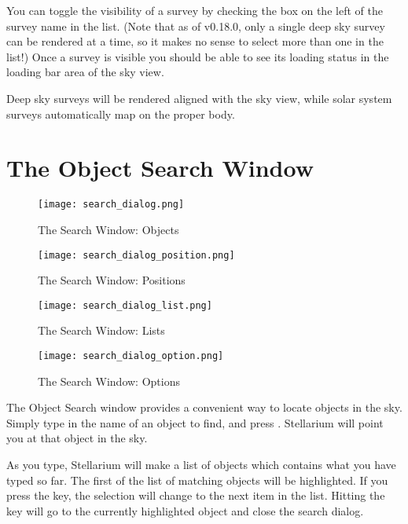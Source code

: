 You can toggle the visibility of a survey by checking the box on the left
of the survey name in the list.  (Note that as of v0.18.0, only a single deep
sky survey can be rendered at a time, so it makes no sense to select more than one in
the list!) Once a survey is visible you should be able to see its loading
status in the loading bar area of the sky view.

Deep sky surveys will be rendered aligned with the sky view, while solar system
surveys automatically map on the proper body.


\section{The Object Search Window}
\label{sec:gui:search}

\begin{figure}[h]
\centering\texttt{[image: search\_dialog.png]}
\caption{The Search Window: Objects}
\label{fig:gui:search}
\end{figure}

\begin{figure}[h]
\centering\texttt{[image: search\_dialog\_position.png]}
\caption{The Search Window: Positions}
\label{fig:gui:search:position}
\end{figure}

\begin{figure}[h]
\centering\texttt{[image: search\_dialog\_list.png]}
\caption{The Search Window: Lists}
\label{fig:gui:search:lists}
\end{figure}


\begin{figure}[h]
\centering\texttt{[image: search\_dialog\_option.png]}
\caption{The Search Window: Options}
\label{fig:gui:search:options}
\end{figure}

The Object Search window provides a convenient way to locate objects
in the sky. Simply type in the name of an object to find, and press
\key{\return}. Stellarium will point you at that object in the sky.

As you type, Stellarium will make a list of objects which contains 
what you have typed so far. The first of the list of matching objects
will be highlighted. If you press the \key{\tab} key, the selection will change
to the next item in the list. Hitting the \key{\return} key will go to the
currently highlighted object and close the search dialog.


